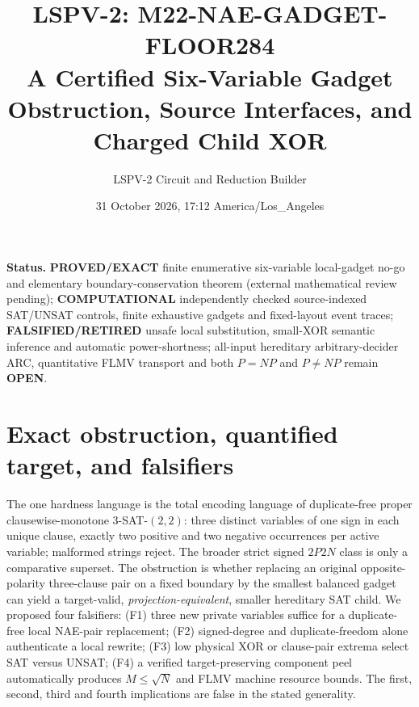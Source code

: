 \documentclass[11pt]{article}
\title{LSPV-2: M22-NAE-GADGET-FLOOR284\\A Certified Six-Variable Gadget Obstruction, Source Interfaces, and Charged Child XOR}
\author{LSPV-2 Circuit and Reduction Builder}
\date{31 October 2026, 17:12 America/Los\_Angeles}
\begin{document}
\maketitle
\noindent\textbf{Status.} \textbf{PROVED/EXACT} finite enumerative six-variable local-gadget no-go and elementary boundary-conservation theorem (external mathematical review pending); \textbf{COMPUTATIONAL} independently checked source-indexed SAT/UNSAT controls, finite exhaustive gadgets and fixed-layout event traces; \textbf{FALSIFIED/RETIRED} unsafe local substitution, small-XOR semantic inference and automatic power-shortness; all-input hereditary arbitrary-decider ARC, quantitative FLMV transport and both $P=NP$ and $P\ne NP$ remain \textbf{OPEN}.

\section{Exact obstruction, quantified target, and falsifiers}
The one hardness language is the total encoding language of duplicate-free proper clausewise-monotone $3$-SAT-$(2,2)$: three distinct variables of one sign in each unique clause, exactly two positive and two negative occurrences per active variable; malformed strings reject. The broader strict signed $2P2N$ class is only a comparative superset. The obstruction is whether replacing an original opposite-polarity three-clause pair on a fixed boundary by the smallest balanced gadget can yield a target-valid, \emph{projection-equivalent}, smaller hereditary SAT child. We proposed four falsifiers: (F1) three new private variables suffice for a duplicate-free local NAE-pair replacement; (F2) signed-degree and duplicate-freedom alone authenticate a local rewrite; (F3) low physical XOR or clause-pair extrema select SAT versus UNSAT; (F4) a verified target-preserving component peel automatically produces $M\le\sqrt N$ and FLMV machine resource bounds. The first, second, third and fourth implications are false in the stated generality.
\end{document}
